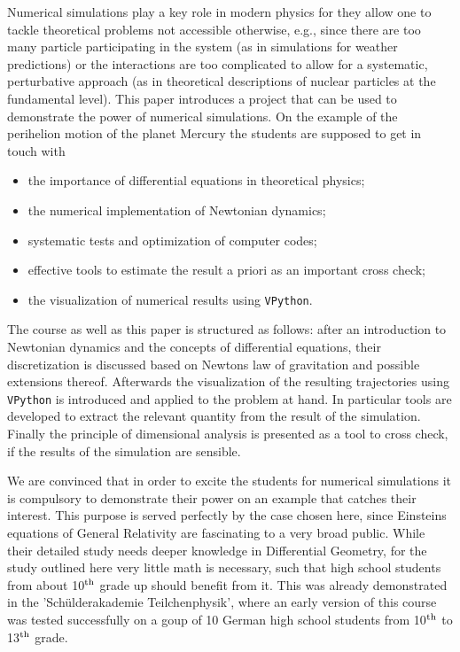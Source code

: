 \documentclass[12pt]{iopart}
\begin{document}
Numerical simulations play a key role in modern physics for they allow one to tackle theoretical problems
not accessible otherwise, e.g., since there are too many particle participating in the system (as in
simulations for weather predictions) or the interactions are too complicated to allow for a systematic,
perturbative approach (as in theoretical descriptions of nuclear particles at the fundamental level). 
 This paper introduces a project that can be used to demonstrate the power of numerical simulations.
On the example of the perihelion motion of the planet Mercury the students are supposed to get in touch with
\begin{itemize}
\item the importance of differential equations in theoretical physics;
\item the numerical implementation of Newtonian dynamics;
\item systematic tests and optimization of computer codes;
\item effective tools to estimate the result a priori as an important cross check;
\item the visualization of numerical results using \texttt{VPython}.
\end{itemize}
The course as well as this paper is structured as follows: after an introduction to Newtonian dynamics and the 
concepts of differential equations, their discretization is discussed based on Newtons law of gravitation and possible
extensions thereof. Afterwards the visualization of the resulting trajectories using \texttt{VPython} is introduced and
applied to the problem at hand. In particular tools are developed to extract the relevant quantity from the result
of the simulation.
Finally the principle of dimensional analysis is presented as a tool to cross check, if the results of the simulation
are sensible.

We are convinced that in order to excite the students for numerical simulations it is compulsory to
demonstrate their power on an example that catches their interest. This purpose is served 
perfectly by the case chosen here, since Einsteins equations of General Relativity are fascinating to
a very broad public. While their detailed study needs deeper knowledge in Differential Geometry, for
the study outlined here very little math is necessary, such that high school students from about 
10$^{\rm th}$ grade up should benefit from it. This was already demonstrated in the
'Sch\"ulderakademie Teilchenphysik', where an early version of this course was tested successfully 
on a goup of 10 German high school students from 10$^{\rm th}$ to 13$^{\rm th}$ grade.
\end{document}
